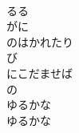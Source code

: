 \documentclass[10pt,b5j]{tarticle} %
\begin{document}
\begin{enumerate}
\begin{minipage}[c]{\blocksize}
        \vspace{\linespace}
        \item~\\
        るる\\
        がに\\
        のはかれたり\\
        び\\
        にこだませば\\
        の\\
        ゆるかな\\
        ゆるかな
    
    \end{minipage}
\end{enumerate} %
\end{document}
